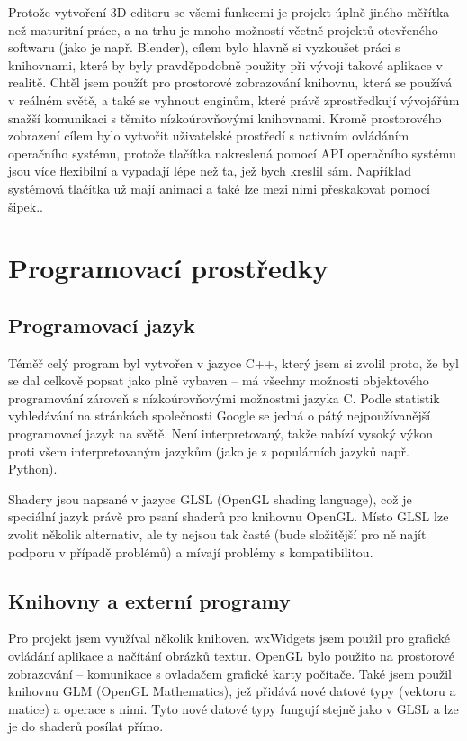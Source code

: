 \documentclass[a4paper, 12pt]{report}
\begin{document}
Protože vytvoření 3D editoru se všemi funkcemi je projekt úplně jiného měřítka než maturitní práce, a na trhu je mnoho možností včetně projektů otevřeného softwaru (jako je např. Blender), cílem bylo hlavně si vyzkoušet práci s knihovnami, které by byly pravděpodobně použity při vývoji takové aplikace v realitě. Chtěl jsem použít pro prostorové zobrazování knihovnu, která se používá v reálném světě, a také se vyhnout enginům, které právě zprostředkují vývojářům snažší komunikaci s těmito nízkoúrovňovými knihovnami. Kromě prostorového zobrazení cílem bylo vytvořit uživatelské prostředí s nativním ovládáním operačního systému, protože tlačítka nakreslená pomocí API operačního systému jsou více flexibilní a vypadají lépe než ta, jež bych kreslil sám. Například systémová tlačítka už mají animaci a také lze mezi nimi přeskakovat pomocí šipek..
%
\chapter{Programovací prostředky}
\section{Programovací jazyk}
Téměř celý program byl vytvořen v jazyce C++, který jsem si zvolil proto, že byl se dal celkově popsat jako plně vybaven -- má všechny možnosti objektového programování zároveň s nízkoúrovňovými možnostmi jazyka C. Podle statistik vyhledávání na stránkách společnosti Google se jedná o pátý nejpoužívanější programovací jazyk na světě\cite{github:pypl}. Není interpretovaný, takže nabízí vysoký výkon proti všem interpretovaným jazykům (jako je z populárních jazyků např. Python).

Shadery jsou napsané v jazyce GLSL (OpenGL shading language), což je speciální jazyk právě pro psaní shaderů pro knihovnu OpenGL. Místo GLSL lze zvolit několik alternativ, ale ty nejsou tak časté (bude složitější pro ně najít podporu v případě problémů) a mívají problémy s kompatibilitou.
\section{Knihovny a externí programy}
Pro projekt jsem využíval několik knihoven. wxWidgets jsem použil pro grafické ovládání aplikace a načítání obrázků textur. OpenGL bylo použito na prostorové zobrazování -- komunikace s ovladačem grafické karty počítače. Také jsem použil knihovnu GLM (OpenGL Mathematics), jež přidává nové datové typy (vektoru a matice) a operace s nimi. Tyto nové datové typy fungují stejně jako v GLSL a lze je do shaderů posílat přímo.
%
\end{document}
